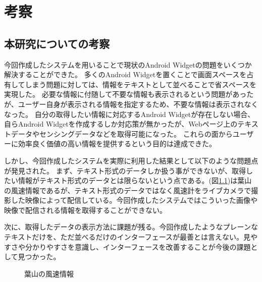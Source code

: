 \chapter{考察}
\label{chap:consideration}

\section{本研究についての考察}

今回作成したシステムを用いることで現状のAndroid Widgetの問題をいくつか解決することができた。
多くのAndroid Widgetを置くことで画面スペースを占有してしまう問題に対しては、情報をテキストとして並べることで省スペースを実現した。
必要な情報に付随して不要な情報も表示されるという問題があったが、ユーザー自身が表示される情報を指定するため、不要な情報は表示されなくなった。
自分の取得したい情報に対応するAndroid Widgetが存在しない場合、自らAndroid Widgetを作成するしか対応策が無かったが、Webページ上のテキストデータやセンシングデータなどを取得可能になった。
これらの面からユーザーに効率良く価値の高い情報を提供するという目的は達成できた。

しかし、今回作成したシステムを実際に利用した結果として以下のような問題点が発見された。
まず、テキスト形式のデータしか扱う事ができないが、取得したい情報がテキスト形式のデータとは限らないという点である。(図\ref{fig:hayama_wind})は葉山の風速情報であるが、テキスト形式のデータではなく風速計をライブカメラで撮影した映像によって配信している。今回作成したシステムではこういった画像や映像で配信される情報を取得することができない。

次に、取得したデータの表示方法に課題が残る。今回作成したようなプレーンなテキストだけを、ただ並べるだけのインターフェースが最善とは言えない。見やすさや分かりやすさを意識し、インターフェースを改善することが今後の課題として見つかった。

\begin{figure}[htbp]
  \begin{minipage}{\hsize}
    \begin{center}
    \end{center}
    \caption{葉山の風速情報}
    \label{fig:hayama_wind}
  \end{minipage}
\end{figure}

